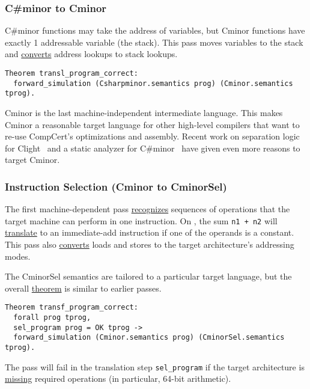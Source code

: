 \subsubsection{C\#minor to Cminor}
C\#minor functions may take the address of variables, but Cminor functions have exactly 1 addressable variable (the stack).
This pass moves variables to the stack and \href{https://github.com/AbsInt/CompCert/blob/master/cfrontend/Cminorgen.v#L86}{converts} address lookups to stack lookups.
\begin{lstlisting}[style=Coq]
Theorem transl_program_correct:
  forward_simulation (Csharpminor.semantics prog) (Cminor.semantics tprog).
\end{lstlisting}

Cminor is the last machine-independent intermediate language.
This makes Cminor a reasonable target language for other high-level compilers that want to re-use CompCert's optimizations and assembly.
Recent work on separation logic for Clight~\cite{ab-separation} and a static analyzer for C\#minor~\cite{jlblp-verasco} have given even more reasons to target Cminor.


\subsubsection{Instruction Selection (Cminor to CminorSel)}
The first machine-dependent pass \href{https://github.com/AbsInt/CompCert/blob/master/backend/Selection.v#L70}{recognizes} sequences of operations that the target machine can perform in one instruction.
On \intel, the sum {\tt n1 + n2} will \href{https://github.com/AbsInt/CompCert/blob/master/ia32/SelectOp.vp#L90}{translate} to an immediate-add instruction if one of the operands is a constant.
This pass also \href{https://github.com/AbsInt/CompCert/blob/master/backend/Selection.v#L54}{converts} loads and stores to the target architecture's addressing modes.

The CminorSel semantics are tailored to a particular target language, but the overall \href{https://github.com/AbsInt/CompCert/blob/master/backend/Selectionproof.v#L1038}{theorem} is similar to earlier passes.
\begin{lstlisting}[style=Coq]
Theorem transf_program_correct:
  forall prog tprog,
  sel_program prog = OK tprog ->
  forward_simulation (Cminor.semantics prog) (CminorSel.semantics tprog).
\end{lstlisting}

The pass will fail in the translation step \lstinline{sel_program} if the target architecture is \href{https://github.com/AbsInt/CompCert/blob/master/backend/Selection.v#L387}{missing} required operations (in particular, 64-bit arithmetic).


